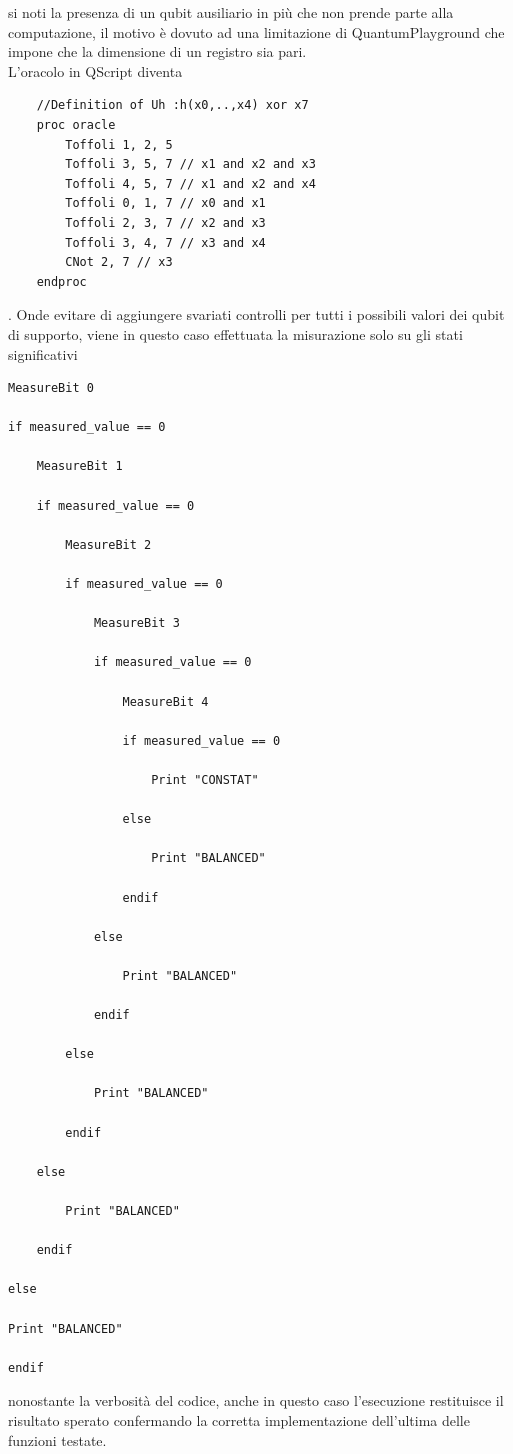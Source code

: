 \documentclass[12pt,a4paper,openright]{report}
\begin{document}
si noti la presenza di un qubit ausiliario in più che non prende parte alla computazione, il motivo è dovuto ad una limitazione
di QuantumPlayground che impone che la dimensione di un registro sia pari.\\
L'oracolo in QScript diventa

\begin{lstlisting}
    //Definition of Uh :h(x0,..,x4) xor x7
    proc oracle
        Toffoli 1, 2, 5
        Toffoli 3, 5, 7 // x1 and x2 and x3
        Toffoli 4, 5, 7 // x1 and x2 and x4 
        Toffoli 0, 1, 7 // x0 and x1
        Toffoli 2, 3, 7 // x2 and x3
        Toffoli 3, 4, 7 // x3 and x4
        CNot 2, 7 // x3
    endproc
\end{lstlisting}

.  Onde evitare di aggiungere svariati controlli per tutti i possibili valori dei qubit di supporto, viene in questo caso effettuata
la misurazione solo su gli stati significativi

\begin{lstlisting}
MeasureBit 0

if measured_value == 0 

	MeasureBit 1

	if measured_value == 0 

		MeasureBit 2

		if measured_value == 0

			MeasureBit 3

			if measured_value == 0 

				MeasureBit 4

				if measured_value == 0 

					Print "CONSTAT"

				else

					Print "BALANCED"

				endif

			else

				Print "BALANCED"

			endif

		else

			Print "BALANCED"

		endif

	else

		Print "BALANCED"

	endif

else

Print "BALANCED"

endif
\end{lstlisting}
nonostante la verbosità del codice, anche in questo caso l'esecuzione restituisce il risultato sperato confermando la corretta
implementazione dell'ultima delle funzioni testate.
\end{document}
